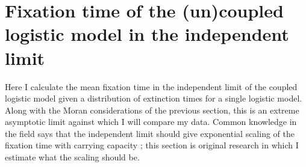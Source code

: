 \section{Fixation time of the (un)coupled logistic model in the independent limit}

Here I calculate the mean fixation time in the independent limit of the coupled logistic model given a distribution of extinction times for a single logistic model. 
Along with the Moran considerations of the previous section, this is an extreme asymptotic limit against which I will compare my data. 
Common knowledge in the field says that the independent limit should give exponential scaling of the fixation time with carrying capacity \cite{Leigh1981,Lande1993,Kamenev2008,Cremer2009a,Dobrinevski2012,Yu2017}; this section is original research in which I estimate what the scaling should be. 

